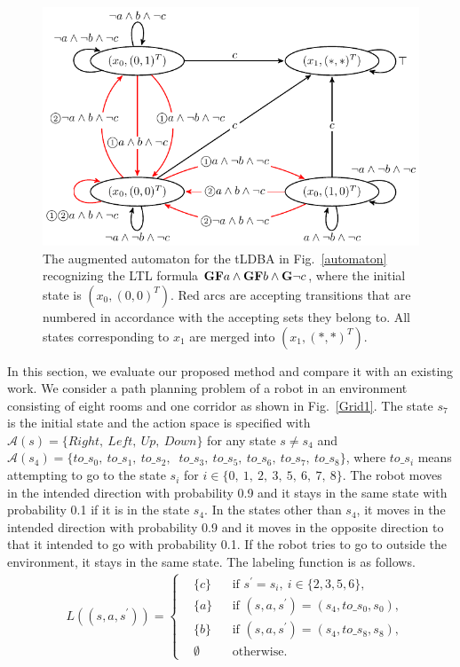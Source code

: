 \documentclass[a4j,12pt,oneside,openany,english,dvipdfmx]{jsbook}
\begin{document}
\begin{figure}[htbp]
   \centering
   \includegraphics[bb=0 0 374 207,scale=0.75]{ldgba.pdf}
   \caption{The augmented automaton for the tLDBA in Fig.~\ref{automaton} recognizing the LTL formula $\text{{\bf GF}}a \wedge \text{{\bf GF}}b \wedge \text{{\bf G}}\neg c$, where the initial state is $(x_0, (0,0)^T )$. Red arcs are accepting transitions that are numbered in accordance with the accepting sets they belong to. All states corresponding to $x_1$ are merged into $(x_1, (*,*)^T )$.}
   \label{automaton_aug}
\end{figure}

In this section, we evaluate our proposed method and compare it with an existing work.
We consider a path planning problem of a robot in an environment consisting of eight rooms and one corridor as shown in Fig.\ \ref{Grid1}. The state $s_7$ is the initial state and the action space is specified with $\mathcal{A}(s) = \{ Right,\ Left,\ Up,\ Down \}$ for any state $s \neq s_4$ and $\mathcal{A}(s_4) = \{ to\_s_0,\ to\_s_1,\ to\_s_2,$ $\ to\_s_3,\ to\_s_5,\ to\_s_6,\ to\_s_7,\ to\_s_8 \}$, where $to\_s_i$ means attempting to go to the state $s_i$ for $i \in \{0,\ 1,\ 2,\ 3,\ 5,\ 6,\ 7,\ 8 \}$. The robot moves in the intended direction with probability 0.9 and it stays in the same state with probability 0.1 if it is in the state $s_4$. In the states other than $s_4$, it moves in the intended direction with probability 0.9 and it moves in the opposite direction to that it intended to go with probability 0.1. If the robot tries to go to outside the environment, it stays in the same state. The labeling function is as follows.
\begin{align*}
      & L((s, a, s^{\prime})) =
      \left\{
      \begin{aligned}
        & \{ c \} &  & \text{if }s^{\prime} = s_i,\ i \in \{ 2,3,5,6 \}, \nonumber \\
        & \{ a \} &  & \text{if }(s,a,s^{\prime})=(s_4,to\_s_0,s_0), \nonumber \\
        & \{ b \} &  & \text{if }(s,a,s^{\prime})=(s_4,to\_s_8, s_8), \nonumber \\
        & \emptyset &  & \text{otherwise}.
      \end{aligned}
      \right.
    \end{align*}
\end{document}
